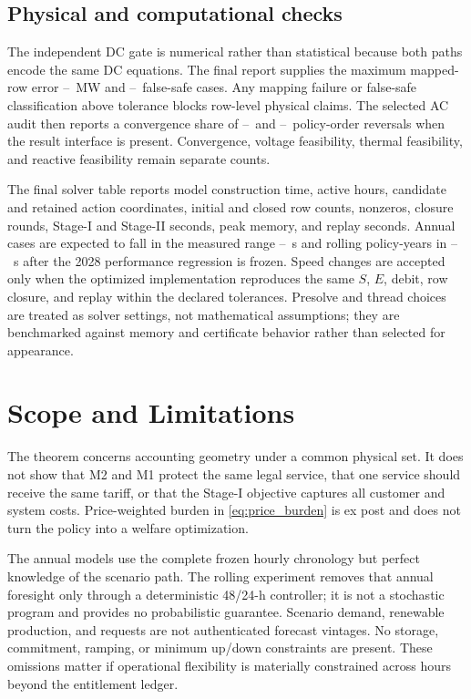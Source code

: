 \documentclass[10pt,journal]{IEEEtran}
\providecommand{\IndependentDCMaxError}{--}
\providecommand{\IndependentDCFalseSafe}{--}
\providecommand{\SelectedACConvergence}{--}
\providecommand{\SelectedACReversals}{--}
\providecommand{\AnnualRuntimeRange}{--}
\providecommand{\RollingRuntimeRange}{--}
\begin{document}
\subsection{Physical and computational checks}

The independent DC gate is numerical rather than statistical because both paths encode the same DC equations. The final report supplies the maximum mapped-row error \IndependentDCMaxError\ MW and \IndependentDCFalseSafe\ false-safe cases. Any mapping failure or false-safe classification above tolerance blocks row-level physical claims. The selected AC audit then reports a convergence share of \SelectedACConvergence\ and \SelectedACReversals\ policy-order reversals when the result interface is present. Convergence, voltage feasibility, thermal feasibility, and reactive feasibility remain separate counts.

The final solver table reports model construction time, active hours, candidate and retained action coordinates, initial and closed row counts, nonzeros, closure rounds, Stage-I and Stage-II seconds, peak memory, and replay seconds. Annual cases are expected to fall in the measured range \AnnualRuntimeRange\ s and rolling policy-years in \RollingRuntimeRange\ s after the 2028 performance regression is frozen. Speed changes are accepted only when the optimized implementation reproduces the same $S$, $E$, debit, row closure, and replay within the declared tolerances. Presolve and thread choices are treated as solver settings, not mathematical assumptions; they are benchmarked against memory and certificate behavior rather than selected for appearance.

\section{Scope and Limitations}
\label{sec:limitations}

The theorem concerns accounting geometry under a common physical set. It does not show that M2 and M1 protect the same legal service, that one service should receive the same tariff, or that the Stage-I objective captures all customer and system costs. Price-weighted burden in \eqref{eq:price_burden} is ex post and does not turn the policy into a welfare optimization.

The annual models use the complete frozen hourly chronology but perfect knowledge of the scenario path. The rolling experiment removes that annual foresight only through a deterministic 48/24-h controller; it is not a stochastic program and provides no probabilistic guarantee. Scenario demand, renewable production, and requests are not authenticated forecast vintages. No storage, commitment, ramping, or minimum up/down constraints are present. These omissions matter if operational flexibility is materially constrained across hours beyond the entitlement ledger.
\end{document}
